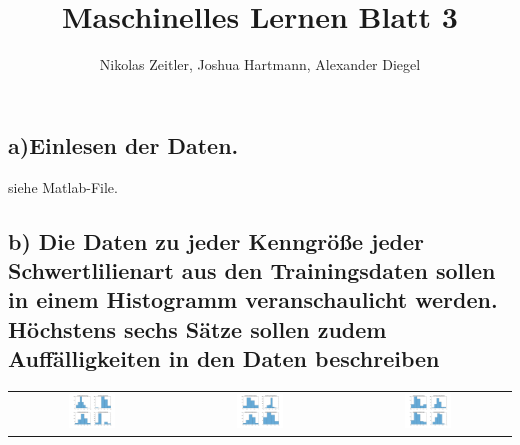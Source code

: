 \documentclass{scrartcl}
\author{Nikolas Zeitler, Joshua Hartmann, Alexander Diegel}
\title{Maschinelles Lernen Blatt 3}
\begin{document}
\maketitle
\subsection*{a)Einlesen der Daten.} siehe Matlab-File.
\subsection*{b) Die Daten zu jeder Kenngröße jeder Schwertlilienart aus den Trainingsdaten sollen in einem Histogramm veranschaulicht werden. Höchstens sechs Sätze sollen zudem Auffälligkeiten in den Daten beschreiben}

\begin{tabular}{ccc}
\includegraphics[width=0.3\textwidth]{plots/trainSetosa.jpg}  &
\includegraphics[width=0.3\textwidth]{plots/trainVersicolor.jpg} & 
\includegraphics[width=0.3\textwidth]{plots/trainVerginica.jpg} 

\end{tabular}
	
\end{document}
